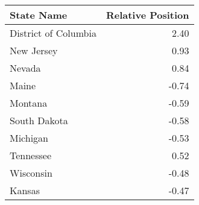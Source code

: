 \begin{tabular}{lr}
\toprule
           State Name &  Relative Position \\
\midrule
 District of Columbia &               2.40 \\
           New Jersey &               0.93 \\
               Nevada &               0.84 \\
                Maine &              -0.74 \\
              Montana &              -0.59 \\
         South Dakota &              -0.58 \\
             Michigan &              -0.53 \\
            Tennessee &               0.52 \\
            Wisconsin &              -0.48 \\
               Kansas &              -0.47 \\
\bottomrule
\end{tabular}

